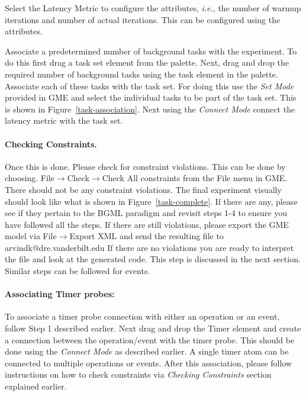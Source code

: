\documentclass[onecolumn]{article}
\begin{document}
\smallskip
{} Select the Latency Metric to configure the
attributes, {\em i.e.}, the number of warmup iterations and number of
actual iterations. This can be configured using the attributes.

\smallskip
{} Associate a predetermined number of background tasks
with the experiment. To do this first drag a task set element from the
palette. Next, drag and drop the required number of background tasks
using the task element in the palette. Associate each of these tasks
with the task set. For doing this use the {\em Set Mode} provided in
GME and select the individual tasks to be part of the task set. This
is shown in Figure~\ref{task-association}. Next using the {\em Connect Mode}
connect the latency metric with the task set.

\paragraph* {\bf Checking Constraints.}
Once this is done. Please check for constraint violations. This can be
done by choosing. File$\rightarrow$Check$\rightarrow$Check All
constraints from the File menu in GME. There should not be any
constraint violations. The final experiment visually should look like
what is shown in Figure~\ref{task-complete}. If there are any, please
see if they pertain to the BGML paradigm and revisit steps 1-4 to
ensure you have followed all the steps. If there are still violations,
please export the GME model via File$\rightarrow$Export XML and send the
resulting file to arvindk@dre.vanderbilt.edu If there are no
violations you are ready to interpret the file and look at the
generated code. This step is discussed in the next section. Similar
steps can be followed for events.

\paragraph* {\bf Associating Timer probes:}
To associate a timer probe connection with either an operation or an
event, follow Step 1 described earlier. Next drag and drop the Timer
element and create a connection between the operation/event with the
timer probe. This should be done using the {\em Connect Mode} as
described earlier.  A single timer atom can be connected to multiple
operations or events. After this association, please follow
instructions on how to check constraints via {\em Checking
Constraints} section explained earlier.
\end{document}
